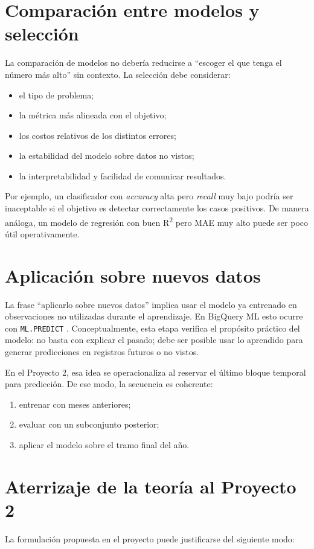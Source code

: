 \documentclass[12pt]{article}
\begin{document}
\section{Comparación entre modelos y selección}
La comparación de modelos no debería reducirse a ``escoger el que tenga el número más alto'' sin contexto. La selección debe considerar:
\begin{itemize}[leftmargin=*]
\item el tipo de problema;
\item la métrica más alineada con el objetivo;
\item los costos relativos de los distintos errores;
\item la estabilidad del modelo sobre datos no vistos;
\item la interpretabilidad y facilidad de comunicar resultados.
\end{itemize}

Por ejemplo, un clasificador con \textit{accuracy} alta pero \textit{recall} muy bajo podría ser inaceptable si el objetivo es detectar correctamente los casos positivos. De manera análoga, un modelo de regresión con buen R\textsuperscript{2} pero MAE muy alto puede ser poco útil operativamente.

\section{Aplicación sobre nuevos datos}
La frase ``aplicarlo sobre nuevos datos'' implica usar el modelo ya entrenado en observaciones no utilizadas durante el aprendizaje. En BigQuery ML esto ocurre con \texttt{ML.PREDICT} \cite{gcp_predict}. Conceptualmente, esta etapa verifica el propósito práctico del modelo: no basta con explicar el pasado; debe ser posible usar lo aprendido para generar predicciones en registros futuros o no vistos.

En el Proyecto 2, esa idea se operacionaliza al reservar el último bloque temporal para predicción. De ese modo, la secuencia es coherente:
\begin{enumerate}[label=\textbf{P\arabic*.}, leftmargin=*]
\item entrenar con meses anteriores;
\item evaluar con un subconjunto posterior;
\item aplicar el modelo sobre el tramo final del año.
\end{enumerate}

\section{Aterrizaje de la teoría al Proyecto 2}
La formulación propuesta en el proyecto puede justificarse del siguiente modo:
\end{document}
